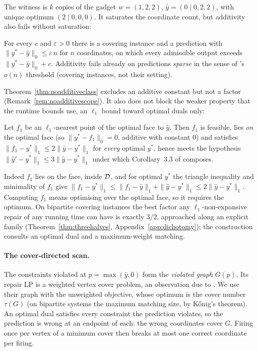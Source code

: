 The witness is $k$ copies of the gadget $w = (1,2,2)$, $\hat y = (0 \mid 0,2,2)$, with unique optimum
$(2 \mid 0,0,0)$. It saturates the coordinate count, but additivity also fails without saturation:

\begin{corollary}\label{cor:sparse}
For every $c$ and $\varepsilon > 0$ there is a covering instance and a prediction with
$\|y^* - \hat y\|_0 \le \varepsilon\, n$ for $n$ coordinates, on which every admissible
output exceeds $\|y^* - \hat y\|_0 + c$. Additivity fails already on predictions \emph{sparse} in
the sense of \citeauthor{chen2022}'s $o(n)$ threshold (covering instances, not their setting).
\end{corollary}

Theorem~\ref{thm:noadditiveclass} excludes an additive constant but not a factor (Remark~\ref{rem:noadditivescope}).
It also does not block the weaker property that the runtime bounds use, an $\ell_1$ bound toward
optimal duals only:

\begin{proposition}\label{prop:faceadditive}
Let $f_1$ be an $\ell_1$-nearest point of the optimal face to $\hat y$. Then $f_1$ is feasible,
lies \emph{on} the optimal face (so $\|y^* - f_1\|_0 = 0$, additive with constant $0$) and
satisfies $\|f_1 - y^*\|_1 \le 2\|\hat y - y^*\|_1$ for \emph{every} optimal $y^*$, hence meets the
hypothesis $\|\hat y' - y^*\|_1 \le 3\|\hat y - y^*\|_1$ under which Corollary~3.3 of
\citet{chen2022} composes.
\end{proposition}
Indeed $f_1$ lies on the face, inside $\mathcal{D}$, and for optimal $y^*$ the triangle inequality and
minimality of $f_1$ give $\|f_1 - y^*\|_1 \le \|f_1 - \hat y\|_1 + \|\hat y - y^*\|_1 \le
2\|\hat y - y^*\|_1$.
Computing $f_1$ means optimising over the optimal face, so it requires the optimum. On bipartite
covering instances the best factor any $\ell_1$-non-expansive repair of any running time can have
is exactly $3/2$, approached along an explicit family (Theorem~\ref{thm:threehalves},
Appendix~\ref{app:dichotomy}); the construction consults an optimal dual and a maximum-weight
matching.

\paragraph{The cover-directed scan.} The constraints violated at $p = \max(\hat y, 0)$ form the
\emph{violated graph} $G(p)$. Its repair LP is a weighted vertex cover problem, an observation due
to \citet[\S3.1]{dinitz2021}. We use their graph with the unweighted objective, whose optimum is the cover number
$\tau(G)$ (on bipartite systems the maximum matching size, by K\H{o}nig's theorem). An optimal dual
satisfies every constraint the prediction violates, so the prediction is wrong at an endpoint of
each: the wrong coordinates cover $G$. Firing once per vertex of a minimum cover then breaks at
most one correct coordinate per firing.

